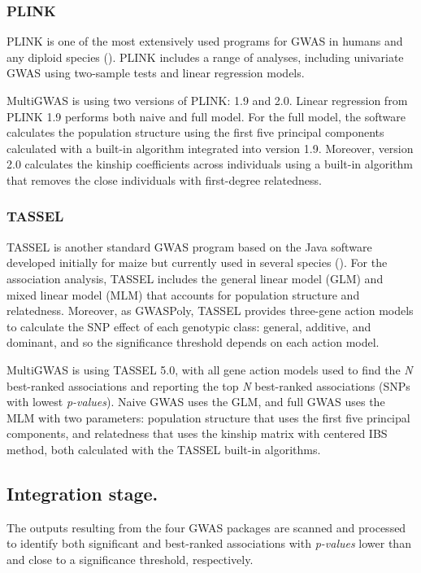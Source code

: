 \documentclass{article}
\begin{document}
\subsubsection{PLINK}
PLINK is one of the most extensively used programs for GWAS in humans and any diploid species (\cite{Power2016}). PLINK includes a range of analyses, including univariate GWAS using two-sample tests and linear regression models.

MultiGWAS is using two versions of PLINK: 1.9 and 2.0. Linear regression from PLINK 1.9 performs both naive and full model. For the full model, the software calculates the population structure using the first five principal components calculated with a built-in algorithm integrated into version 1.9. Moreover, version 2.0 calculates the kinship coefficients across individuals using a built-in algorithm that removes the close individuals with first-degree relatedness.

\subsubsection{TASSEL\label{subsec_TASSEL}}
TASSEL is another standard GWAS program based on the Java software developed initially for maize but currently used in several species (\cite{Alvarez2017,Zhang2018}). For the association analysis, TASSEL includes the general linear model (GLM) and mixed linear model (MLM) that accounts for population structure and relatedness. Moreover, as GWASPoly, TASSEL provides three-gene action models to calculate the SNP effect of each genotypic class: general, additive, and dominant, and so the significance threshold depends on each action model.

MultiGWAS is using TASSEL 5.0, with all gene action models used to find the \emph{N} best-ranked associations and reporting the top \emph{N} best-ranked associations (SNPs with lowest \emph{p-values}). Naive GWAS uses the GLM, and full GWAS uses the MLM with two parameters: population structure that uses the first five principal components, and relatedness that uses the kinship matrix with centered IBS method, both calculated with the TASSEL built-in algorithms. 


\subsection{Integration stage.}
The outputs resulting from the four GWAS packages are scanned and processed to identify both significant and best-ranked associations with \emph{p-values} lower than and close to a significance threshold, respectively. 
\end{document}

